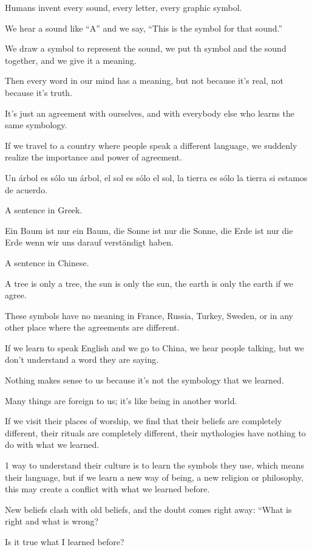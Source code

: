 \documentclass{article}
\numberwithin{equation}{section}
\begin{document}
Humans invent every sound, every letter, every graphic symbol.

We hear a sound like ``A'' and we say, ``This is the symbol for that sound.''

We draw a symbol to represent the sound, we put th symbol and the sound together, and we give it a meaning.

Then every word in our mind has a meaning, but not because it's real, not because it's truth.

It's just an agreement with ourselves, and with everybody else who learns the same symbology.

%
If we travel to a country where people speak a different language, we suddenly realize the importance and power of agreement.

Un \'arbol es s\'olo un \'arbol, el sol es s\'olo el sol, la tierra es s\'olo la tierra si estamos de acuerdo.

\textsf{A sentence in Greek.}

Ein Baum ist nur ein Baum, die Sonne ist nur die Sonne, die Erde ist nur die Erde wenn wir uns darauf verst\"andigt haben.

\textsf{A sentence in Chinese.}

A tree is only a tree, the sun is only the sun, the earth is only the earth if we agree.

These symbols have no meaning in France, Russia, Turkey, Sweden, or in any other place where the agreements are different.

%
If we learn to speak English and we go to China, we hear people talking, but we don't understand a word they are saying.

Nothing makes sense to us because it's not the symbology that we learned.

Many things are foreign to us; it's like being in another world.

If we visit their places of worship, we find that their beliefs are completely different, their rituals are completely different, their mythologies have nothing to do with what we learned.

1 way to understand their culture is to learn the symbols they use, which means their language, but if we learn a new way of being, a new religion or philosophy, this may create a conflict with what we learned before.

New beliefs clash with old beliefs, and the doubt comes right away: ``What is right and what is wrong?

Is it true what I learned before?
\end{document}
